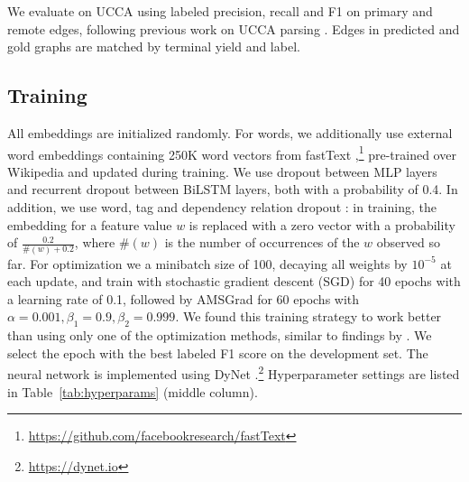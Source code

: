 \documentclass[11pt,a4paper]{article}
\newcommand{\oa}[1]{\footnote{\color{red}OA: #1}}
\DeclareMathOperator*{\argmax}{argmax}
\begin{document}
We evaluate on UCCA using labeled precision, recall and F1 on primary and remote edges,
following previous work on UCCA parsing \cite{hershcovich2017a}.
Edges in predicted and gold graphs are matched by terminal yield and label.



\subsection{Training}

All embeddings are initialized randomly.
For words, we additionally use external word embeddings containing 250K word vectors from fastText
\cite{bojanowski2016enriching},\footnote{\url{https://github.com/facebookresearch/fastText}}
pre-trained over Wikipedia and updated during training.
We use dropout \cite{srivastava2014dropout} between MLP layers and recurrent dropout
\cite{NIPS2016_6241} between BiLSTM layers, both with a probability of 0.4.
In addition, we use word, tag and dependency relation dropout \cite{kiperwasser2016simple}:
in training, the embedding for a feature value $w$ is replaced with a zero vector
with a probability of $\frac{0.2}{\#(w)+0.2}$, where $\#(w)$ is the number of occurrences of the
$w$ observed so far.
For optimization we a minibatch size of 100, decaying all weights by $10^{-5}$ at each update,
and train with stochastic gradient descent (SGD) for 40 epochs with a learning
rate of 0.1, followed by AMSGrad \cite{j.2018on} for 60 epochs with
$\alpha=0.001,\beta_1=0.9,\beta_2=0.999$.
We found this training strategy to work better than using only one of the optimization methods,
similar to findings by \citet{keskar2017improving}.
We select the epoch with the best labeled F1 score on the development set.
The neural network is implemented using DyNet \cite{neubig2017dynet}.\footnote{\url{https://dynet.io}}
Hyperparameter settings are listed in Table~\ref{tab:hyperparams} (middle column).

%
%
\end{document}
